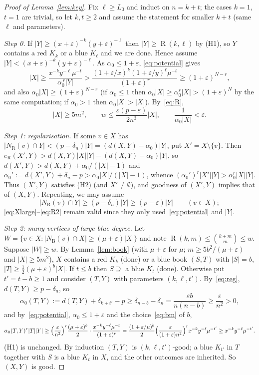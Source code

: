 \documentclass[11pt]{article}
\theoremstyle{definition}
\newcommand{\eR}{e_{\mathrm R}}
\newcommand{\NR}{N_{\mathrm R}}
\newcommand{\NB}{N_{\mathrm B}}
\newcommand{\eps}{\varepsilon}
\DeclareMathOperator{\Ram}{R}
\begin{document}
\begin{proof}[Proof of Lemma~\ref{lem:key}]
Fix $\ell\ge L_0$ and induct on $n=k+t$; the cases $k=1$, $t=1$ are trivial, so let $k,t\ge2$ and assume the statement for smaller $k+t$ (same $\ell$ and parameters).

\smallskip\noindent\emph{Step 0.}  If $|Y|\ge(x+\eps)^{-k}(y+\eps)^{-\ell}$ then $|Y|\ge\Ram(k,\ell)$ by (H1), so $Y$ contains a red $K_k$ or a blue $K_\ell$ and we are done.  Hence assume $|Y|<(x+\eps)^{-k}(y+\eps)^{-\ell}$.  As $\alpha_0\le1+\eps$, \eqref{eq:potential} gives
\begin{equation}\label{eq:Xlarge}
|X|\ge\frac{x^{-k}y^{-\ell}\mu^{-t}}{\alpha_0^{\,r}|Y|}>\frac{(1+\eps/x)^k(1+\eps/y)^\ell\mu^{-t}}{(1+\eps)^r}\ge(1+\eps)^{N-r},
\end{equation}
and also $\alpha_0|X|\ge(1+\eps)^{N-r}$ (if $\alpha_0\le1$ then $\alpha_0|X|\ge\alpha_0^r|X|>(1+\eps)^N$ by the same computation; if $\alpha_0>1$ then $\alpha_0|X|>|X|$).  By~\eqref{eq:R},
\begin{equation}\label{eq:R2}
|X|\ge5m^2,\qquad w\le\frac{\eps(p-\eps)}{2n^3}|X|,\qquad\frac1{\alpha_0|X|}<\eps .
\end{equation}

\smallskip\noindent\emph{Step 1: regularisation.}
If some $v\in X$ has $|\NR(v)\cap Y|<(p-\delta_n)|Y|=(d(X,Y)-\alpha_0)|Y|$, put $X'=X\setminus\{v\}$.  Then $\eR(X',Y)>d(X,Y)|X||Y|-(d(X,Y)-\alpha_0)|Y|$, so $d(X',Y)>d(X,Y)+\alpha_0/(|X|-1)$ and $\alpha_0':=d(X',Y)+\delta_n-p>\alpha_0|X|/(|X|-1)$, whence $(\alpha_0')^r|X'||Y|>\alpha_0^r|X||Y|$.  Thus $(X',Y)$ satisfies (H2) (and $X'\ne\emptyset$), and goodness of $(X',Y)$ implies that of $(X,Y)$.  Repeating, we may assume
\begin{equation}\label{eq:reg}
|\NR(v)\cap Y|\ge(p-\delta_n)|Y|\ge(p-\eps)|Y|\qquad(v\in X);
\end{equation}
\eqref{eq:Xlarge}--\eqref{eq:R2} remain valid since they only used~\eqref{eq:potential} and $|Y|$.

\smallskip\noindent\emph{Step 2: many vertices of large blue degree.}
Let $W=\{v\in X:|\NB(v)\cap X|\ge(\mu+\eps)|X|\}$ and note $\Ram(k,m)\le\binom{k+m}m\le w$.  Suppose $|W|\ge w$.  By Lemma~\ref{lem:book} (with $\mu+\eps$ for $\mu$; $m\ge5b^2/(\mu+\eps)$ and $|X|\ge5m^2$), $X$ contains a red $K_k$ (done) or a blue book $(S,T)$ with $|S|=b$, $|T|\ge\frac12(\mu+\eps)^b|X|$.  If $t\le b$ then $S\supseteq$ a blue $K_t$ (done).  Otherwise put $t'=t-b\ge1$ and consider $(T,Y)$ with parameters $(k,\ell,t')$.  By~\eqref{eq:reg}, $d(T,Y)\ge p-\delta_n$, so
\[
\alpha_0(T,Y):=d(T,Y)+\delta_{k+t'}-p\ge\delta_{n-b}-\delta_n=\frac{\eps b}{n(n-b)}\ge\frac\eps{n^2}>0,
\]
and by~\eqref{eq:potential}, $\alpha_0\le1+\eps$ and the choice~\eqref{eq:bm} of $b$,
\[
\alpha_0(T,Y)^r|T||Y|\ge\Bigl(\frac\eps{n^2}\Bigr)^r\frac{(\mu+\eps)^b}2\cdot\frac{x^{-k}y^{-\ell}\mu^{-t}}{(1+\eps)^r}
=\frac{(1+\eps/\mu)^b}2\Bigl(\frac\eps{(1+\eps)n^2}\Bigr)^rx^{-k}y^{-\ell}\mu^{-t'}\ge x^{-k}y^{-\ell}\mu^{-t'} .
\]
(H1) is unchanged.  By induction $(T,Y)$ is $(k,\ell,t')$-good; a blue $K_{t'}$ in $T$ together with $S$ is a blue $K_t$ in $X$, and the other outcomes are inherited.  So $(X,Y)$ is good.


\end{proof}
\end{document}
